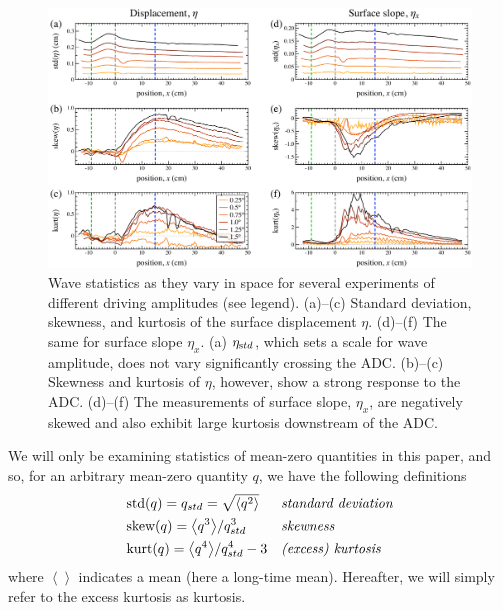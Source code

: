 \documentclass[11pt]{article}
\newcommand{\mean}[1]{\left< #1 \right>}
\newcommand{\etastd}{\eta_{\text std}}
\newcommand{\skw}{\text{skew}}
\newcommand{\var}{\text{var}}
\newcommand{\kurt}{\text{kurt}}
\newcommand{\std}{\text{std}}
\begin{document}
\begin{figure}%
\begin{center}
\includegraphics[width = 0.8 \linewidth]{Figs/ExpSpatialStats.pdf}
\caption{Wave statistics as they vary in space for several experiments of different driving amplitudes (see legend). (a)--(c) Standard deviation, skewness, and kurtosis of the surface displacement $\eta$. (d)--(f) The same for surface slope $\eta_x$. (a) $\etastd$, which sets a scale for wave amplitude, does not vary significantly crossing the ADC. (b)--(c) Skewness and kurtosis of $\eta$, however, show a strong response to the ADC. (d)--(f) The measurements of surface slope, $\eta_x$, are negatively skewed and also exhibit large kurtosis downstream of the ADC. }
\label{ExpSpatialStats}
\end{center}
\end{figure}
 
	We will only be examining statistics of mean-zero quantities in this paper, and so, for an arbitrary mean-zero quantity $q$, we have the following definitions
\begin{align}
& \std(q) = q_{std}= \sqrt{\mean{q^2}}
&&\mbox{\em standard deviation} \\
& \skw(q) = {\mean{q^3}} / {q_{std}^3}	
&&\mbox{\em skewness} \\
& \kurt(q) = {\mean{q^4}} / {q_{std}^4} - 3
&&\mbox{\em (excess) kurtosis}
\end{align}
where $\mean{}$ indicates a mean (here a long-time mean). Hereafter, we will simply refer to the excess kurtosis as kurtosis.
 
\end{document}
